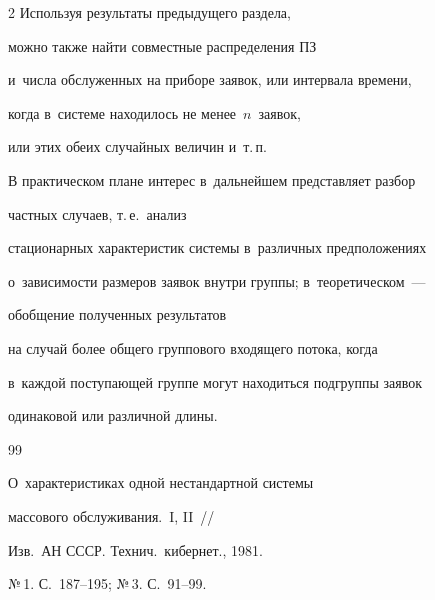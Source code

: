 \begin{multicols}{2}
Используя результаты предыдущего раздела,


можно также найти совместные распределения ПЗ 


и~числа обслуженных на приборе заявок, или интервала времени,


когда в~системе находилось не менее~$n$~заявок, 


или этих обеих случайных величин и~т.\,п.





В практическом плане интерес в~дальнейшем представляет разбор


 частных случаев, т.\,е.\ анализ


стационарных характеристик системы в~различных предположениях 


о~зависимости размеров заявок внутри группы; в~теоретическом~---


обобщение полученных результатов


на случай более общего группового входящего потока, когда


в~каждой поступающей группе могут находиться подгруппы заявок


одинаковой или различной длины.





\vspace*{-18pt}





{\small\frenchspacing


 {%




 \begin{thebibliography}{99}


 


 \vspace*{-3pt}


 






О~характеристиках одной нестандартной системы


массового обслуживания.~I, II~//


Изв.\ АН СССР. Технич.\ кибернет., 1981.


№\,1. С.~187--195; №\,3. С.~91--99.






\end{thebibliography}}}
\end{multicols}
